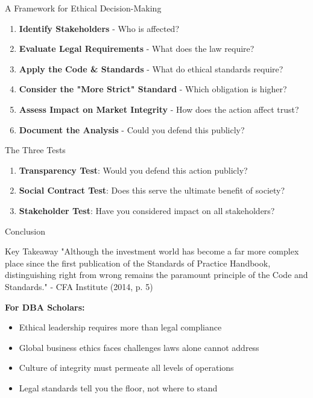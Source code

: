 \documentclass{beamer}
\renewcommand{\small}{\fontsize{7pt}{9pt}\selectfont}
\begin{document}
	\begin{frame}{A Framework for Ethical Decision-Making}
		\small
		\begin{enumerate}
			\item \textbf{Identify Stakeholders} - Who is affected?
			\item \textbf{Evaluate Legal Requirements} - What does the law require?
			\item \textbf{Apply the Code \& Standards} - What do ethical standards require?
			\item \textbf{Consider the "More Strict" Standard} - Which obligation is higher?
			\item \textbf{Assess Impact on Market Integrity} - How does the action affect trust?
			\item \textbf{Document the Analysis} - Could you defend this publicly?
		\end{enumerate}
		
		\vspace{0.2cm}
		\begin{block}{The Three Tests}
			\begin{enumerate}
				\item \textbf{Transparency Test}: Would you defend this action publicly?
				\item \textbf{Social Contract Test}: Does this serve the ultimate benefit of society?
				\item \textbf{Stakeholder Test}: Have you considered impact on all stakeholders?
			\end{enumerate}
		\end{block}
	\end{frame}
	
	\begin{frame}{Conclusion}
		\begin{block}{Key Takeaway}
			"Although the investment world has become a far more complex place since the first publication of the Standards of Practice Handbook, distinguishing right from wrong remains the paramount principle of the Code and Standards."
			- CFA Institute (2014, p. 5)
		\end{block}
		
		\vspace{0.2cm}
		\textbf{For DBA Scholars:}
		\begin{itemize}
			\item Ethical leadership requires \textcolor{cfablue}{more than legal compliance}
			\item Global business ethics faces challenges laws alone cannot address
			\item Culture of integrity must permeate all levels of operations
			\item Legal standards tell you the \textcolor{cfablue}{floor}, not where to stand
		\end{itemize}
	\end{frame}
	
\end{document}

